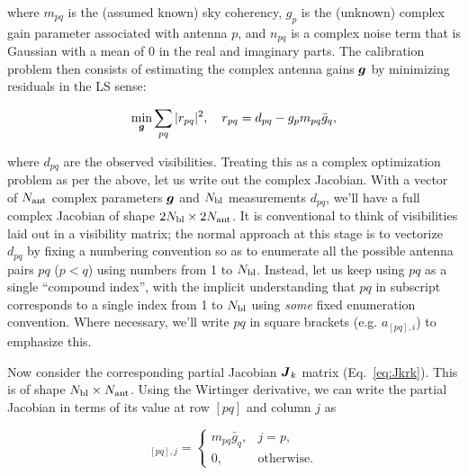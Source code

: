 \documentclass[useAMS,usenatbib]{mn2e}
\newcommand{\mat}[1]{{\bmath{#1}}}
\newcommand{\JJ}{\mat{J}} %
\numberwithin{equation}{section} %
\providecommand{\DIFaddbegin}{} %
\providecommand{\DIFaddend}{} %
\providecommand{\DIFdelbegin}{} %
\providecommand{\DIFdelend}{} %
\begin{document}
\DIFdelend where $m_{pq}$ is the (assumed known) sky coherency, $g_p$ is the (unknown) complex gain parameter 
associated with antenna $p$, and $n_{pq}$ is a complex noise term that is Gaussian with a mean of 0 in the real and 
imaginary parts. The calibration problem then consists of estimating the complex antenna gains $\bmath{g}$ by
minimizing residuals in the LS sense:
\DIFdelbegin %

\DIFdelend \begin{equation}
\label{eq:cal:DI}
\min_{\bmath{g}}\sum_{pq}|r_{pq}|^2,~~~r_{pq}=d_{pq}-g_p m_{pq} \bar{g}_q, 
\end{equation}
\DIFdelbegin %

\DIFdelend where $d_{pq}$ are the observed visibilities. Treating this as a complex optimization problem as per the above, 
let us write out the complex Jacobian. 
With a vector of $N_\mathrm{ant}$ complex parameters $\bmath{g}$ and $N_\mathrm{bl}$ measurements $d_{pq}$, we'll have a full complex
Jacobian of shape $2N_\mathrm{bl}\times2N_\mathrm{ant}$. It is conventional
to think of visibilities laid out in a visibility matrix; the normal approach at this stage is to vectorize $d_{pq}$ 
by fixing a numbering convention so as to enumerate all the possible antenna pairs $pq$ ($p<q$) using numbers from 1 to $N_\mathrm{bl}$.
Instead, let us keep using $pq$ as a single ``compound index'', with the implicit understanding that $pq$ in 
subscript corresponds to a single index from 1 to $N_\mathrm{bl}$ using \emph{some} fixed enumeration convention. 
Where necessary, we'll write $pq$ in square brackets (e.g. $a_{[pq],i}$) to emphasize this.

Now consider the corresponding partial Jacobian $\JJ_k$ matrix (Eq.~\ref{eq:Jkrk}). This is of shape $N_\mathrm{bl}\times N_\mathrm{ant}$. 
Using the Wirtinger derivative, we can write the
partial Jacobian in terms of its value at row $[pq]$ and column $j$ as 
\DIFdelbegin %

\DIFdelend \DIFaddbegin \begin{equation}
\DIFaddend [ \JJ_k ]_{[pq],j} = \left \{  
  \begin{array}{ll} 
  m_{pq}\bar{g}_q,& j=p, \\
  0, & \mathrm{otherwise.}
  \end{array}
\right .
\DIFdelbegin %
\end{equation}%
\begin{equation}%
\DIFdelend \DIFaddbegin \end{equation}
\DIFaddend 
\end{document}
